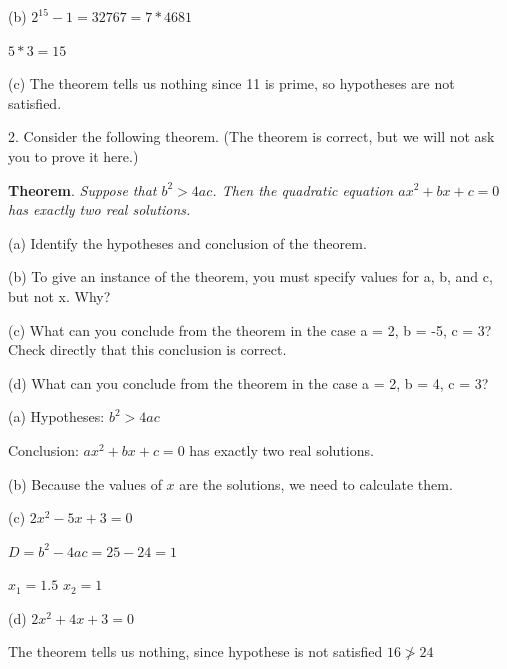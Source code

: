 \documentclass{article}
\begin{document}
(b) $2^{15}-1 = 32767 = 7*4681$

$5*3 = 15$

\vspace{20pt}

(c) The theorem tells us nothing since 11 is prime, so hypotheses are not satisfied.

\vspace{30pt}

2. Consider the following theorem. (The theorem is correct, but we will not
ask you to prove it here.)

\textbf{Theorem}. \textit{Suppose that $b^2 > 4ac$. Then the quadratic equation $ax^2 +
bx + c = 0$ has exactly two real solutions.}

\hspace{12pt}(a) Identify the hypotheses and conclusion of the theorem.

\hspace{12pt}(b) To give an instance of the theorem, you must specify values for a, b,
and c, but not x. Why?

\hspace{12pt}(c) What can you conclude from the theorem in the case a = 2, b = -5,
c = 3? Check directly that this conclusion is correct.

\hspace{12pt}(d) What can you conclude from the theorem in the case a = 2, b = 4,
c = 3?

\vspace{20pt}

(a) Hypotheses: $b^2 > 4ac$

Conclusion: $ax^2 + bx + c = 0$ has exactly two real solutions.

\vspace{20pt}

(b) Because the values of $x$ are the solutions, we need to calculate them.

\vspace{20pt}

(c) $2x^2 - 5x + 3 = 0$

$D = b^2 - 4ac = 25 - 24 = 1$

$x_1 = 1.5$ $x_2 = 1$

\vspace{20pt}

(d) $2x^2 + 4x + 3 = 0$

The theorem tells us nothing, since hypothese is not satisfied $16 \ngtr 24$


\vspace{30pt}
\end{document}
